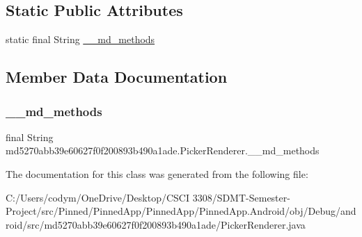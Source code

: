 \subsection*{Static Public Attributes}
\begin{DoxyCompactItemize}
\item 
static final String \hyperlink{classmd5270abb39e60627f0f200893b490a1ade_1_1_picker_renderer_a74038f85b1fb16f11210e480152a004c}{\+\_\+\+\_\+md\+\_\+methods}
\end{DoxyCompactItemize}


\subsection{Member Data Documentation}
\mbox{\label{classmd5270abb39e60627f0f200893b490a1ade_1_1_picker_renderer_a74038f85b1fb16f11210e480152a004c}} 
\subsubsection{\texorpdfstring{\+\_\+\+\_\+md\+\_\+methods}{\_\_md\_methods}}
{\footnotesize\ttfamily final String md5270abb39e60627f0f200893b490a1ade.\+Picker\+Renderer.\+\_\+\+\_\+md\+\_\+methods\hspace{0.3cm}{\ttfamily [static]}}



The documentation for this class was generated from the following file\+:\begin{DoxyCompactItemize}
\item 
C\+:/\+Users/codym/\+One\+Drive/\+Desktop/\+C\+S\+C\+I 3308/\+S\+D\+M\+T-\/\+Semester-\/\+Project/src/\+Pinned/\+Pinned\+App/\+Pinned\+App/\+Pinned\+App.\+Android/obj/\+Debug/android/src/md5270abb39e60627f0f200893b490a1ade/Picker\+Renderer.\+java\end{DoxyCompactItemize}

